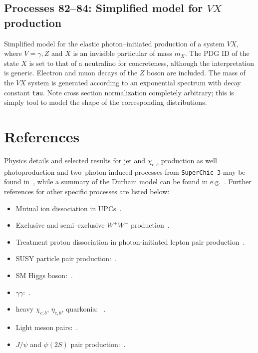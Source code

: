 \documentclass[12pt]{article}
\begin{document}
\subsection{Processes 82--84: Simplified model for $VX$ production}

Simplified model for the elastic photon--initiated production of a system $VX$, where $V=\gamma,Z$ and $X$ is an invisible particular of mass $m_X$. The PDG ID of the state $X$ is set to that of a neutralino for concreteness, although the interpretation is generic. Electron and muon decays of the $Z$ boson are included. The mass of the $VX$ system is generated according to an exponential spectrum with decay constant \texttt{tau}. Note cross section normalization completely arbitrary; this is simply tool to model the shape of the corresponding distributions.

\section{References}\label{sec:ref}



Physics details and selected results for jet and $\chi_{c,b}$ production as well photoproduction and two--photon induced processes from \texttt{SuperChic 3} may be found in~\cite{Harland-Lang:2015cta}, while a summary of the Durham model can be found in e.g.~\cite{Harland-Lang:2014dta,Harland-Lang:2014lxa,Harland-Lang:2015eqa}. 
Further references for other specific processes are listed below:
\begin{itemize}
\item Mutual ion dissociation in UPCs~\cite{Harland-Langiondiss}.
\item Exclusive and semi--exclusive $W^+ W^-$ production~\cite{Bailey:2022wqy}.
\item Treatment proton dissociation in photon-initiated lepton pair production~\cite{Harland-Lang:2020veo}.
\item SUSY particle pair production:~\cite{Harland-Lang:2018hmi}.
\item SM Higgs boson:~\cite{HarlandLang:2013jf}.
\item $\gamma\gamma$:~\cite{HarlandLang:2010ep,HarlandLang:2012qz}.
\item heavy $\chi_{c,b}$, $\eta_{c,b}$, quarkonia: ~\cite{HarlandLang:2009qe,HarlandLang:2010ep,HarlandLang:2010ys}. 
\item Light meson pairs:~\cite{HarlandLang:2011qd,Harland-Lang:2013ncy,Harland-Lang:2013qia}.
\item $J/\psi$ and $\psi(2S)$ pair production:~\cite{Harland-Lang:2014efa}.
\end{itemize}
\end{document}
